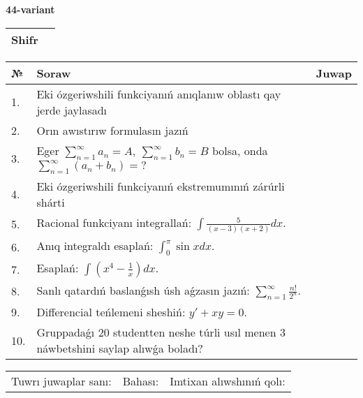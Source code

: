 \documentclass{article}
\begin{document}
  \egroup
  
  \newpage
  
  
  \textbf{44-variant}\\
  
  \bgroup
  \def\arraystretch{1.6} %
  
  \begin{tabular}{|m{5.7cm}|m{9.5cm}|}
  \hline
  Shifr & \\
  \hline
  \end{tabular}
  
  \vspace{1cm}
  
  \begin{tabular}{|m{0.7cm}|m{10cm}|m{4cm}|}
  \hline
  № & Soraw & Juwap \\
  \hline
  1. & Eki ózgeriwshili funkciyanıń anıqlanıw oblastı qay jerde jaylasadı &  \\
  \hline
  2. & Orın awıstırıw formulasın jazıń &  \\
  \hline
  3. & Eger \(\sum_{n = 1}^{\infty}a_{n} = A,\ \sum_{n = 1}^{\infty}b_{n} = B\) bolsa, onda \(\sum_{n = 1}^{\infty}\left( a_{n} + b_{n} \right) = ?\) &  \\
  \hline
  4. & Eki ózgeriwshili funkciyanıń ekstremumınıń zárúrli shárti &  \\
  \hline
  5. & Racional funkciyanı integrallań: \(\int{\frac{5}{(x - 3)(x + 2)}dx}\). &  \\
  \hline
  6. & Anıq integraldı esaplań: \(\int_{0}^{\pi}{\sin xdx}\). &  \\
  \hline
  7. & Esaplań: \(\int\left( x^{4} - \frac{1}{x} \right)dx\). &  \\
  \hline
  8. & Sanlı qatardıń baslanǵısh úsh aǵzasın jazıń: \(\sum_{n = 1}^{\infty}\frac{n!}{2^{n}}\). &  \\
  \hline
  9. & Differencial teńlemeni sheshiń: \(y' + xy = 0\). &  \\
  \hline
  10. & Gruppadaǵı 20 studentten neshe túrli usıl menen 3 náwbetshini saylap alıwǵa boladı? &  \\
  \hline
  \end{tabular}
  
  \vspace{1cm}
  
  \begin{tabular}{lll}
  Tuwrı juwaplar sanı: \underline{\hspace{1.5cm}} & 
  Bahası: \underline{\hspace{1.5cm}} & 
  Imtixan alıwshınıń qolı: \underline{\hspace{2cm}} \\
  \end{tabular}
  
\end{document}

